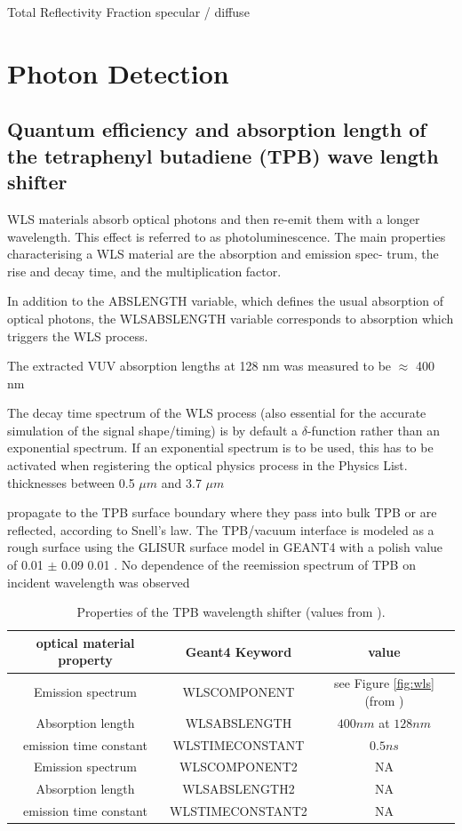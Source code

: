 \documentclass{article}
\begin{document}
Total Reflectivity
Fraction specular / diffuse

  
  \clearpage
  \section{Photon Detection}
\subsection{Quantum efficiency and absorption length of the tetraphenyl butadiene (TPB) wave length shifter}
WLS materials absorb optical photons and then re-emit them with a longer wavelength. This
effect is referred to as photoluminescence.
The main properties characterising a WLS material are the absorption and emission spec-
trum, the rise and decay time, and the multiplication factor.

In addition
to the ABSLENGTH variable, which defines the usual absorption of optical photons, the
WLSABSLENGTH variable corresponds to absorption which triggers the WLS process.

The extracted VUV absorption lengths at 128 nm was measured to be $\approx$  400 nm \cite{ref:wls}


The decay time spectrum of the WLS process (also essential for the accurate simulation of
the signal shape/timing) is by default a $\delta$-function rather than an exponential spectrum.
If an exponential spectrum is to be used, this has to be activated when registering the
optical physics process in the Physics List. 
thicknesses between 0.5 $\mu m$ and 3.7 $\mu m$


propagate to the TPB surface boundary where they pass
into bulk TPB or are reflected, according to Snell’s law.
The TPB/vacuum interface is modeled as a rough
surface using the GLISUR surface model  in GEANT4
with a polish value of 0.01 $\pm$ 0.09 0.01 .
No dependence of the reemission spectrum of TPB on incident wavelength was observed
\begin{table}[h!]
  \begin{center}
    \label{tab:wls}
    \begin{tabular}{|c|c|c|} 
      \hline
      \textbf{optical material property} &\textbf{ Geant4 Keyword} & \textbf{value}\\
      \hline
      Emission spectrum  & WLSCOMPONENT & see Figure \ref{fig:wls} (from  \cite{ref:wls})  \\
      Absorption length  & WLSABSLENGTH & $400 nm$ at $128 nm$ \\
      emission time constant                           &  WLSTIMECONSTANT        & $0.5 ns$  \\
      Emission spectrum  & WLSCOMPONENT2 & NA  \\
      Absorption length  & WLSABSLENGTH2 & NA \\
      emission time constant                           &  WLSTIMECONSTANT2        & NA  \\
      \hline
    \end{tabular}
  \end{center}
  \caption{Properties of the TPB wavelength shifter (values from \cite{ref:wls}).}
 \end{table}
\end{document}
